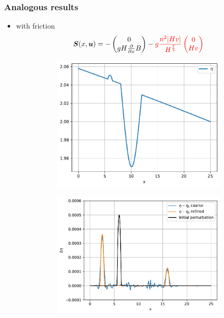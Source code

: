 \documentclass[pt12]{beamer}
\newcommand{\uvec}[2][3]{\boldsymbol{#2\mkern-#1mu}\mkern#1mu}
\begin{document}
\begin{frame}
\frametitle{Analogous results}

\begin{itemize}

\item with friction
$$
\boldsymbol{S}(x,\uvec{u})=-\begin{pmatrix}
0\\
gH\frac{\partial}{\partial x} \textcolor{black}{B}
\end{pmatrix}-\textcolor{red}{g\frac{n^2\vert Hv \vert}{H^{\frac{7}{3}}} \begin{pmatrix}
0\\
Hv
\end{pmatrix}}
$$



\begin{figure}
     \centering
     \begin{subfigure}[b]{0.4\textwidth}
         \centering
         \includegraphics[width=\textwidth]{friction/friction_sub.pdf}
     \end{subfigure}
     \begin{subfigure}[b]{0.4\textwidth}
         \centering
         \includegraphics[width=\textwidth]{alb_sub_fri_WBp2s14jr.pdf}

\end{subfigure}
\end{figure}
\end{itemize}
\end{frame}
\end{document}
